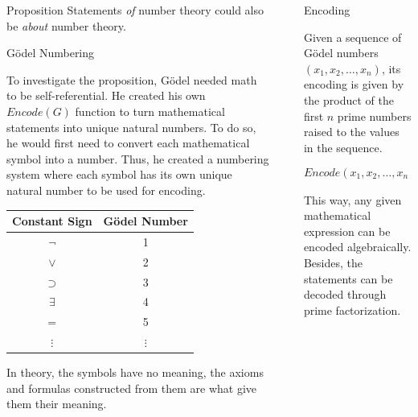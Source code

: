 \documentclass[final]{beamer}
\newlength{\sepwidth}
\newlength{\colwidth}
\newcommand{\separatorcolumn}{\begin{column}{\sepwidth}\end{column}}
\begin{document}
\begin{frame}[t]
\begin{columns}[t]
\begin{column}{\colwidth}
\begin{exampleblock}{Proposition}
      Statements \textit{of} number theory could also be \textit{about} number theory.

\end{exampleblock}


\begin{block}{Gödel Numbering}

      To investigate the proposition, Gödel needed math to be self-referential. He created his own $Encode(G)$ function to turn mathematical statements into unique natural numbers. To do so, he would first need to convert each mathematical symbol into a number. Thus, he created a numbering system where each symbol has its own unique natural number to be used for encoding.

    \begin{table}[h]
    \centering
    \begin{tabular}{c|c}
    \textbf{Constant Sign} & \textbf{Gödel Number} \\ \hline
    $\neg$ & 1 \\ 
    $\lor$ & 2 \\ 
    $\supset$ & 3 \\ 
    $\exists$ & 4 \\ 
    $=$ & 5 \\ 
    $\vdots$ & $\vdots$ \\ 
    \end{tabular}
    \end{table}

    In theory, the symbols have no meaning, the axioms and formulas constructed from them are what give them their meaning.
    
  \end{block}

\end{column}


\separatorcolumn %


\begin{column}{\colwidth}


  \begin{block}{Encoding}

    Given a sequence of Gödel numbers $(x_1, x_2, \dots, x_n)$, its encoding is given by the product of the first $n$ prime numbers raised to the values in the sequence.

    $$Encode(x_1, x_2, \dots, x_n) = 2^{x_1} \times 3^{x_2} \times \ldots \times p_n^{x_n}$$

    This way, any given mathematical expression can be encoded algebraically. Besides, the statements can be decoded through prime factorization.


\end{block}
\end{column}
\end{columns}
\end{frame}
\end{document}
